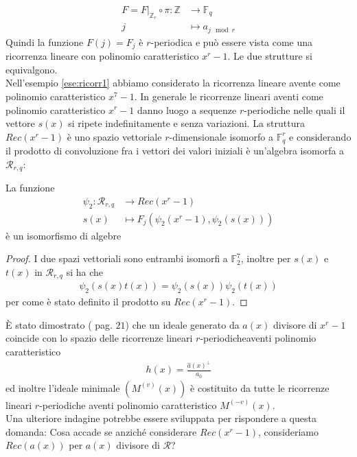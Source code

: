 \begin{align*}
F = F\bigr|_{\mathbb{Z}_{r}} \circ\pi: \mathbb{Z} &\longrightarrow \mathbb{F}_{q}  \\
              j &\longmapsto a_{j \mod{r}}
\end{align*}
Quindi la funzione $F(j) = F_{j}$ è $r$-periodica e può essere vista come una ricorrenza lineare con polinomio caratteristico $x^r -1$. Le due strutture si equivalgono.\\
Nell'esempio \ref{ese:ricorr1} abbiamo considerato la ricorrenza lineare avente come polinomio caratteristico $x^7 - 1$. In generale le ricorrenze lineari aventi come polinomio caratteristico $x^r-1$ danno luogo a sequenze $r$-periodiche nelle quali il vettore $s(x)$ si ripete indefinitamente e senza variazioni. La struttura $Rec(x^r-1)$ è uno spazio vettoriale $r$-dimensionale isomorfo a $\mathbb{F}_{q}^{r}$ e considerando il prodotto di convoluzione fra i vettori dei valori iniziali è un'algebra isomorfa a $\mathcal{R}_{r,q}$:
\begin{teorema}
   La funzione
   \begin{align*}
      \psi_{2}: \mathcal{R}_{r,q}  & \longrightarrow Rec(x^r-1)   \\
                           s(x)         &\longmapsto F_{j}(\psi_{2}(x^r-1),\psi_{2}(s(x)))
   \end{align*}
   è un isomorfismo di algebre
\end{teorema}
\begin{proof}
   I due spazi vettoriali sono entrambi isomorfi a  $\mathbb{F}_{2}^{7}$, inoltre per $s(x)$ e $t(x)$ in $\mathcal{R}_{r,q} $ si ha che
   \begin{align*}
      \psi_{2} (s(x) t(x)) = \psi_{2} (s(x)) \psi_{2} (t(x))
   \end{align*}
   per come è stato definito il prodotto su $Rec(x^r-1)$.
\end{proof}
È stato dimostrato (\cite{cerruti} pag. $21$) che un ideale generato da $a(x)$ divisore di $x^r-1$ coincide con lo spazio delle ricorrenze lineari $r$-periodicheaventi polinomio caratteristico
\begin{align*}
   h(x) = \frac{\hat{a}(x)^{\perp}}{a_{0}}
\end{align*}
ed inoltre l'ideale minimale $(M^{(v)}(x))$ è costituito da tutte le ricorrenze lineari $r$-periodiche aventi polinomio caratteristico $M^{(-v)}(x)$.\\
Una ulteriore indagine potrebbe essere sviluppata per rispondere a questa domanda:
Cosa accade se anziché considerare $Rec(x^r-1)$, consideriamo $Rec(a(x))$ per $a(x)$ divisore di $\mathcal{R}$?

